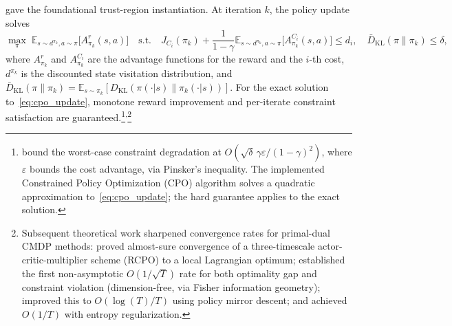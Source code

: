 \citet{Achiam2017} gave the foundational trust-region instantiation.
At iteration $k$, the policy update solves
\begin{equation}
  \max_\pi \; \mathbb{E}_{s \sim d^{\pi_k}\!, a \sim \pi}
    \bigl[A^r_{\pi_k}(s,a)\bigr]
  \quad \text{s.t.} \quad
  J_{C_i}(\pi_k) + \frac{1}{1-\gamma}
    \mathbb{E}_{s \sim d^{\pi_k}\!, a \sim \pi}
    \bigl[A^{C_i}_{\pi_k}(s,a)\bigr] \leq d_i,
  \quad
  \bar{D}_{\mathrm{KL}}(\pi \| \pi_k) \leq \delta,
  \label{eq:cpo_update}
\end{equation}
where $A^r_{\pi_k}$ and $A^{C_i}_{\pi_k}$ are the advantage functions for
the reward and the $i$-th cost, $d^{\pi_k}$ is the discounted state
visitation distribution, and
$\bar{D}_{\mathrm{KL}}(\pi\|\pi_k)
= \mathbb{E}_{s \sim \pi_k}[D_{\mathrm{KL}}(\pi(\cdot|s)\|\pi_k(\cdot|s))]$.
For the exact solution to~\eqref{eq:cpo_update}, monotone reward improvement
and per-iterate constraint satisfaction are
guaranteed.\footnote{\citet{Achiam2017} bound the worst-case constraint
degradation at
$O(\sqrt{\delta}\,\gamma\varepsilon/(1-\gamma)^2)$, where $\varepsilon$
bounds the cost advantage, via Pinsker's inequality. The implemented
Constrained Policy Optimization (CPO) algorithm solves a quadratic
approximation to~\eqref{eq:cpo_update}; the hard guarantee applies to the
exact solution.}\textsuperscript{,}\footnote{Subsequent theoretical work
sharpened convergence rates for primal-dual CMDP methods:
\citet{Tessler2019} proved almost-sure convergence of a three-timescale
actor-critic-multiplier scheme (RCPO) to a local Lagrangian optimum;
\citet{Ding2020} established the first non-asymptotic
$O(1/\sqrt{T})$ rate for both optimality gap and constraint violation
(dimension-free, via Fisher information geometry);
\citet{Liu2022cmdp} improved this to $O(\log(T)/T)$ using policy mirror
descent; and \citet{Ying2022} achieved $O(1/T)$ with entropy
regularization.}


